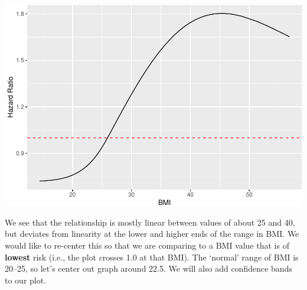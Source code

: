 \documentclass[
]{book}
\newenvironment{Shaded}{\begin{snugshade}}{\end{snugshade}}
\newcommand{\DataTypeTok}[1]{\textcolor[rgb]{0.13,0.29,0.53}{#1}}
\newcommand{\DecValTok}[1]{\textcolor[rgb]{0.00,0.00,0.81}{#1}}
\newcommand{\FloatTok}[1]{\textcolor[rgb]{0.00,0.00,0.81}{#1}}
\newcommand{\KeywordTok}[1]{\textcolor[rgb]{0.13,0.29,0.53}{\textbf{#1}}}
\newcommand{\NormalTok}[1]{#1}
\newcommand{\OperatorTok}[1]{\textcolor[rgb]{0.81,0.36,0.00}{\textbf{#1}}}
\newcommand{\OtherTok}[1]{\textcolor[rgb]{0.56,0.35,0.01}{#1}}
\newcommand{\StringTok}[1]{\textcolor[rgb]{0.31,0.60,0.02}{#1}}
\begin{document}
\begin{Shaded}
\end{Shaded}

\includegraphics{adv_epi_analysis_files/figure-latex/unnamed-chunk-244-1.pdf}

We see that the relationship is mostly linear between values of about 25 and 40, but deviates from linearity at the lower and higher ends of the range in BMI. We would like to re-center this so that we are comparing to a BMI value that is of \textbf{lowest} risk (i.e., the plot crosses 1.0 at that BMI). The `normal' range of BMI is 20--25, so let's center out graph around 22.5. We will also add confidence bands to our plot.
\end{document}
